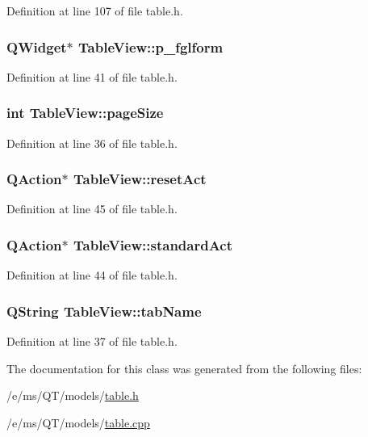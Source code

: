 Definition at line 107 of file table.h.

\hypertarget{classTableView_a1d048152ea82f3f8d33e538cb032b37b}{
\subsubsection[{p\_\-fglform}]{\setlength{\rightskip}{0pt plus 5cm}QWidget$\ast$ {\bf TableView::p\_\-fglform}}}
\label{classTableView_a1d048152ea82f3f8d33e538cb032b37b}


Definition at line 41 of file table.h.

\hypertarget{classTableView_abb4a46ca1492e88b8fe2fa9b68595340}{
\subsubsection[{pageSize}]{\setlength{\rightskip}{0pt plus 5cm}int {\bf TableView::pageSize}}}
\label{classTableView_abb4a46ca1492e88b8fe2fa9b68595340}


Definition at line 36 of file table.h.

\hypertarget{classTableView_a513618ab0a9e4a3048ab617b68ba4409}{
\subsubsection[{resetAct}]{\setlength{\rightskip}{0pt plus 5cm}QAction$\ast$ {\bf TableView::resetAct}}}
\label{classTableView_a513618ab0a9e4a3048ab617b68ba4409}


Definition at line 45 of file table.h.

\hypertarget{classTableView_a24e6725afbdbe0fded4ee3409fc877a7}{
\subsubsection[{standardAct}]{\setlength{\rightskip}{0pt plus 5cm}QAction$\ast$ {\bf TableView::standardAct}}}
\label{classTableView_a24e6725afbdbe0fded4ee3409fc877a7}


Definition at line 44 of file table.h.

\hypertarget{classTableView_aa26e19998b21b401d0f7b4c703a7c91d}{
\subsubsection[{tabName}]{\setlength{\rightskip}{0pt plus 5cm}QString {\bf TableView::tabName}}}
\label{classTableView_aa26e19998b21b401d0f7b4c703a7c91d}


Definition at line 37 of file table.h.



The documentation for this class was generated from the following files:\begin{DoxyCompactItemize}
\item 
/e/ms/QT/models/\hyperlink{table_8h}{table.h}\item 
/e/ms/QT/models/\hyperlink{table_8cpp}{table.cpp}\end{DoxyCompactItemize}
